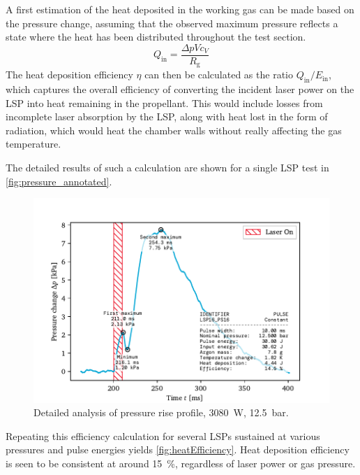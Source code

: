             A first estimation of the heat deposited in the working gas can be made based on the pressure change, assuming that the observed maximum pressure reflects a state where the heat has been distributed throughout the test section. 
            \begin{equation}
                Q_\mathrm{in} = \frac{\Delta pVc_V}{R_\mathrm{g}}
            \end{equation}
            The heat deposition efficiency $\eta$ can then be calculated as the ratio $Q_\mathrm{in}/E_\mathrm{in}$, which captures the overall efficiency of converting the incident laser power on the LSP into heat remaining in the propellant. This would include losses from incomplete laser absorption by the LSP, along with heat lost in the form of radiation, which would heat the chamber walls without really affecting the gas temperature.

            The detailed results of such a calculation are shown for a single LSP test in \autoref{fig:pressure_annotated}.

            \begin{figure}[h]
                \centering
                \includegraphics[]{assets/5 results/pressure_an_LSP16_PS16}
                \caption[Detailed analysis of pressure rise profile]{Detailed analysis of pressure rise profile, \qty{3080}{W}, \qty{12.5}{bar}.}
                \label{fig:pressure_annotated}
            \end{figure}

            Repeating this efficiency calculation for several LSPs sustained at various pressures and pulse energies yields \autoref{fig:heatEfficiency}. Heat deposition efficiency is seen to be consistent at around 15~\%, regardless of laser power or gas pressure.

